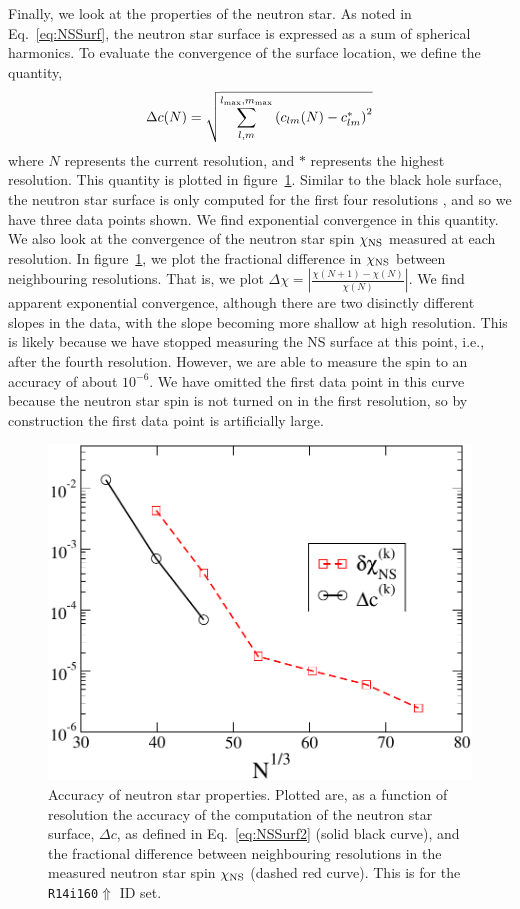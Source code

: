 Finally, we look at the properties of the neutron star. As noted in Eq.~\ref{eq:NSSurf},
the neutron star surface is expressed as a sum of spherical
harmonics.
To evaluate the convergence of the surface location, we define the
quantity,
\begin{equation}
\label{eq:NSSurf2}
\Delta c(N)=\sqrt{\sum_{l,m}^{l_{\rm max},m_{\rm max}}\left(c_{lm}(N)-c^{*}_{lm}\right)^2}
\end{equation}
where $N$ represents the current resolution, and $*$ represents the
highest resolution. This quantity is plotted in
figure~\ref{fig:SpinDiff}. Similar to the black hole surface, the
neutron star surface is only computed for the first four resolutions ,
and so we have three data points shown. We find exponential
convergence in this quantity. We also look at the convergence of the
neutron star spin $\chi_{\rm NS}$ measured at each resolution. In
figure~\ref{fig:SpinDiff}, we plot the fractional difference in
$\chi_{\rm NS}$ between neighbouring resolutions. That is, we plot
$
\Delta\chi=|\frac{\chi(N+1)-\chi(N)}{\chi(N)}|.
$
 We find apparent
exponential convergence, although there are two disinctly different
slopes in the data, with the slope becoming more shallow at high
resolution. This is likely because we have stopped measuring the NS
surface at this point, i.e., after the fourth resolution. However, we are able to measure the spin to an
accuracy of about $10^{-6}$. 
 We have omitted the first data point in this curve
because the neutron star spin is not turned on in the first
resolution, so by construction the first data point is artificially large.

\begin{figure}
\includegraphics[width=0.95\columnwidth]{chap4/SpinDiff}
\caption[Neutron star surface and spin accuracy.]{\label{fig:SpinDiff}
  Accuracy of neutron star properties. Plotted are, as a function of resolution the accuracy of the computation of the neutron star
  surface, $\Delta c$, as defined in Eq.~\ref{eq:NSSurf2} (solid black
  curve), and the fractional difference between neighbouring
  resolutions in the measured neutron star spin $\chi_{\rm NS}$ (dashed red
  curve). This is for the {\tt R14i160$\Uparrow$} ID set.}
\end{figure}

